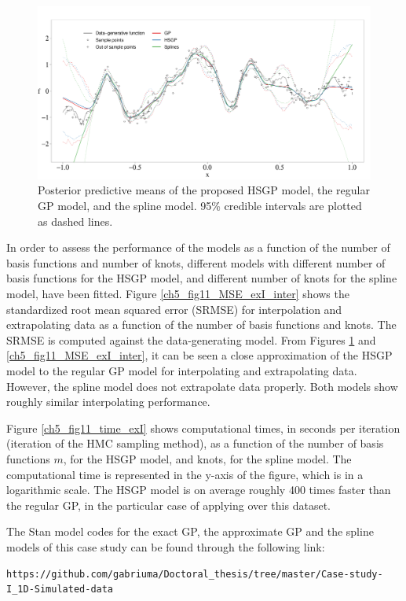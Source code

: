 \documentclass[onecolumn,a4paper,11pt]{article}
\begin{document}
\begin{figure}
\centering
\includegraphics[width=\textwidth]{ch5_fig10_Posteriors_exI.pdf}
\caption{Posterior predictive means of the proposed HSGP model, the regular GP model, and the spline model. 95\% credible intervals are plotted as dashed lines.}
  \label{ch5_fig10_Posteriors_exI}
\end{figure}

In order to assess the performance of the models as a function of the number of basis functions and number of knots, different models with different number of basis functions for the HSGP model, and different number of knots for the spline model, have been fitted. Figure \ref{ch5_fig11_MSE_exI_inter} shows the standardized root mean squared error (SRMSE) for interpolation and extrapolating data as a function of the number of basis functions and knots. The SRMSE is computed against the data-generating model. From Figures \ref{ch5_fig10_Posteriors_exI} and \ref{ch5_fig11_MSE_exI_inter}, it can be seen a close approximation of the HSGP model to the regular GP model for interpolating and extrapolating data. However, the spline model does not extrapolate data properly. Both models show roughly similar interpolating performance. 

Figure \ref{ch5_fig11_time_exI} shows computational times, in seconds per iteration (iteration of the HMC sampling method), as a function of the number of basis functions $m$, for the HSGP model, and knots, for the spline model. The computational time is represented in the y-axis of the figure, which is in a logarithmic scale. The HSGP model is on average roughly 400 times faster than the regular GP, in the particular case of applying over this dataset.

The Stan model codes for the exact GP, the approximate GP and the spline models of this case study can be found through the following link:
%
\begin{lstlisting}[breaklines]
https://github.com/gabriuma/Doctoral_thesis/tree/master/Case-study-I_1D-Simulated-data
\end{lstlisting}
\end{document}
